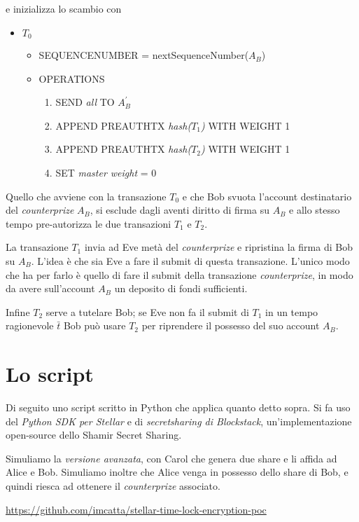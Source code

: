 e inizializza lo scambio con
\begin{itemize}
	\item $ T_0 $
	      \begin{itemize}
		      \item SEQUENCE\textunderscore NUMBER = nextSequenceNumber($ A_B $)
		      \item OPERATIONS
		            \begin{enumerate}
			            \item SEND \textit{all} TO $ A_B^{\prime} $
			            \item APPEND PRE\textunderscore AUTH\textunderscore TX
			                  \textit{hash($ T_{1} $)} WITH WEIGHT 1
			            \item APPEND PRE\textunderscore AUTH\textunderscore TX
			                  \textit{hash($ T_{2} $)} WITH WEIGHT 1
			            \item SET \textit{master weight} = 0
		            \end{enumerate}
	      \end{itemize}
\end{itemize}

Quello che avviene con la transazione $ T_0 $ e che
Bob svuota l'account destinatario del \textit{counterprize} $ A_B $, si esclude
dagli aventi diritto di firma su $ A_B $ e allo stesso tempo pre-autorizza
le due transazioni $ T_1 $ e $ T_2 $.

La transazione $ T_1 $ invia ad Eve metà del \textit{counterprize}
e ripristina la firma di Bob su $ A_B $.
L'idea è che sia Eve a fare il submit di questa transazione. L'unico modo che ha per
farlo è quello di fare il submit della transazione \textit{counterprize}, in modo da avere
sull'account $ A_B $ un deposito di fondi sufficienti.

Infine $ T_2 $ serve a tutelare Bob; se Eve non fa il submit di $ T_{1} $ in un tempo ragionevole
$ \bar{t} $ Bob può usare $ T_2 $ per riprendere il possesso del suo account $ A_B $.


\section{Lo script}
Di seguito uno script scritto in Python che applica quanto detto sopra.
Si fa uso del \textit{Python SDK per Stellar} e di
\textit{secretsharing di Blockstack}, un'implementazione open-source dello
Shamir Secret Sharing.

Simuliamo la \textit{versione avanzata}, con Carol che genera due share e li
affida ad Alice e Bob.
Simuliamo inoltre che Alice venga in possesso dello share di Bob, e quindi riesca ad
ottenere il \textit{counterprize} associato.

\url{https://github.com/imcatta/stellar-time-lock-encryption-poc}